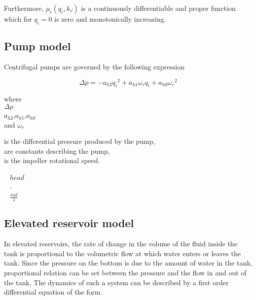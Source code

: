 Furthermore, $\mu_i(q_i,k_v)$ is a continuously differentiable and proper function which for $q_i = 0$ is zero and monotonically increasing.

\subsection{Pump model}
\label{pump_component}

Centrifugal pumps are governed by the following expression \cite{kallesoePHD}

\begin{equation}
  \Delta p = -a_{h2}{q_i}^2 + a_{h1} \omega_r q_i + a_{h0}{\omega_r}^2
  \label{eq:PumpModel}
\end{equation}

\begin{minipage}[t]{0.20\textwidth}
where\\
\hspace*{8mm} $\Delta p$ \\
\hspace*{8mm} $a_{h2}$,$a_{h1}$,$a_{h0}$ \\
and \hspace*{0.7mm} $\omega_r$ 

\end{minipage}
\begin{minipage}[t]{0.68\textwidth}
\vspace*{2mm}
is the differential pressure produced by the pump,\\
are constants describing the pump,\\
is the impeller rotational speed.
\end{minipage}
\begin{minipage}[t]{0.10\textwidth}
\vspace*{2mm}
\textcolor{White}{te}$\unit{head}$\\
\textcolor{White}{te}$\unit{\cdot}$\\
\textcolor{White}{te}$\unit{\frac{rad}{s}}$
\end{minipage}  

\subsection{Elevated reservoir model}
\label{elevatedreservoir_component}

In elevated reservoirs, the rate of change in the volume of the fluid inside the tank is proportional to the volumetric flow at which water enters or leaves the tank. Since the pressure on the bottom is due to the amount of water in the tank, proportional relation can be set between the pressure and the flow in and out of the tank. The dynamics of such a system can be described by a first order differential equation of the form

